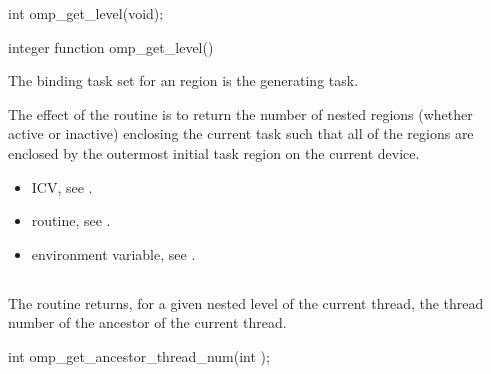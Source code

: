 \format
\ccppspecificstart
\begin{boxedcode}
int omp\_get\_level(void);
\end{boxedcode}
\ccppspecificend

\fortranspecificstart
\begin{boxedcode}
integer function omp\_get\_level()
\end{boxedcode}
\fortranspecificend

\binding
The binding task set for an  region is the generating task. 

\effect
The effect of the  routine is to return the number of nested 
 regions (whether active or inactive) enclosing the current task such that all 
of the  regions are enclosed by the outermost initial task region on the 
current device.

\crossreferences
\begin{itemize}
\item {} ICV, see 
.

\item {} routine, see 
.

\item {} environment variable, see 
.
\end{itemize}










\subsection{}
\label{subsec:omp_get_ancestor_thread_num}
\summary
The  routine returns, for a given nested level of 
the current thread, the thread number of the ancestor of the current thread.

\begin{samepage}
\format
\ccppspecificstart
\begin{boxedcode}
int omp\_get\_ancestor\_thread\_num(int );
\end{boxedcode}
\ccppspecificend
\end{samepage}

